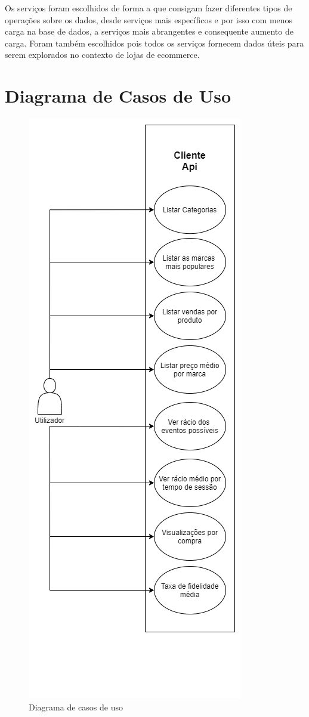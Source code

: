 \documentclass[11pt,a4paper]{article}
\begin{document}
Os serviços foram escolhidos de forma a que consigam fazer diferentes tipos de operações sobre os dados, desde serviços mais específicos e por isso com menos carga na base de dados, a serviços mais abrangentes e consequente aumento de carga. Foram também escolhidos pois todos os serviços fornecem dados úteis para serem explorados no contexto de lojas de ecommerce. 
\section{Diagrama de Casos de Uso}
\begin{figure}[H]
  \centering
    \includegraphics[scale=0.50]{UseCasesNew.png}
  \caption{Diagrama de casos de uso}
\end{figure}
\end{document}
